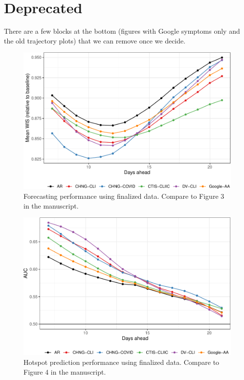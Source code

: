 \documentclass[9pt,twoside,lineno]{pnas-new}
\begin{document}
\hypertarget{deprecated}{%
\section{Deprecated}\label{deprecated}}

There are a few blocks at the bottom (figures with Google symptoms only
and the old trajectory plots) that we can remove once we decide.

\begin{figure}

{\centering \includegraphics[width=\textwidth]{fig/fcast-finalized-1} 

}

\caption{Forecasting performance using finalized data. Compare to Figure 3 in the manuscript.}\label{fig:fcast-finalized}
\end{figure}

\clearpage

\begin{figure}

{\centering \includegraphics[width=\textwidth]{fig/hot-finalized-1} 

}

\caption{Hotspot prediction performance using finalized data. Compare to Figure 4 in the manuscript.}\label{fig:hot-finalized}
\end{figure}
\end{document}
